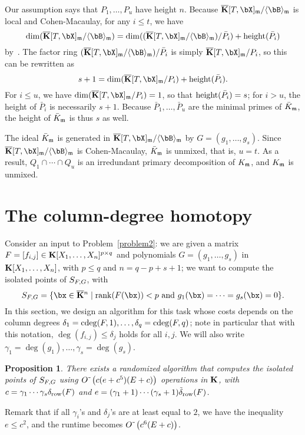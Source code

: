 \documentclass[12pt]{article}
\newtheorem{proposition}[definition]{Proposition}
\begin{document}
Our assumption says that $P_1,\dots,P_u$ have height $n$. Because
$\KKbar[T,\bX]_\m/\langle \bB \rangle_\m$ is local and Cohen-Macaulay, for any
$i \le t$, we have 
$$\dim(\KKbar[T,\bX]_\m/\langle \bB \rangle_\m)=\dim((\KKbar[T,\bX]_\m/\langle \bB \rangle_\m) / \bar P_i) + {\rm height}(\bar P_i)$$
by~\cite[Theorem~17.4(i)]{Matsumura86}.
The factor ring $(\KKbar[T,\bX]_\m/\langle \bB \rangle_\m) / \bar P_i$ is simply
$\KKbar[T,\bX]_\m/P_i$, so this can be rewritten as
$$s+1 = \dim(\KKbar[T,\bX]_\m/P_i) + {\rm height}(\bar P_i).$$ For $i\le
u$, we have $\dim(\KKbar[T,\bX]_\m/P_i)=1$, so that ${\rm height}(\bar
P_i)=s$; for $i > u$, the height of $\bar P_i$ is necessarily
$s+1$. Because $\bar P_1,\dots,\bar P_u$ are the minimal primes of
$\bar K_{\mathfrak{m}}$, the height of $\bar K_{\mathfrak{m}}$ is thus $s$ as well.

The ideal $\bar K_{\mathfrak{m}}$ is generated in $\KKbar[T,\bX]_\m/\langle \bB
\rangle_\m$ by $G=(g_1,\dots,g_s)$. Since $\KKbar[T,\bX]_\m/\langle
\bB \rangle_\m$ is Cohen-Macaulay, $\bar K_{\mathfrak{m}}$ is unmixed, that is,
$u=t$.  As a result, $Q_1 \cap \cdots \cap Q_u$ is an irredundant
primary decomposition of $K_{\mathfrak{m}}$, and $K_{\mathfrak{m}}$ is unmixed.


\section{The column-degree homotopy}\label{sec:columndegree}

Consider an input to Problem~\ref{problem2}: we are given a matrix
${F} =[f_{i,j}]\in \mathbf{K}[X_1,\dots,X_n]^{p \times q}$ and polynomials
$G=(g_1,\dots,g_s)$ in $\mathbf{K}[X_1,\dots,X_n]$, with $p \leq q$ and $n =
q-p+s+1$; we want to compute the isolated points of $S_{{F},G}$,
with
$$S_{\mF,G} = \{\bx \in \KKbar{}^n \mid  \mathrm{rank}(\mF({\bx})) < p
\text{~and~} g_1(\bx)=\cdots=g_s(\bx)=0\}.$$ In this section, we
design an algorithm for this task whose costs depends on the column
degrees $\delta_1=\mathrm{cdeg}({F},1),\dots,\delta_q=\mathrm{cdeg}({F},q)$; note in particular
that with this notation, $\deg(f_{i,j}) \leq \delta_j$ holds for all $i,j$.
We will also write $\gamma_1=\deg(g_1),\dots,\gamma_s=\deg(g_s)$.

\begin{proposition}
  There exists a randomized algorithm that computes the isolated
  points of $S_{{F},G}$ using ${O}{\,\tilde{ }\,}\left (c(e+c^5 )(E + c)\right)$
  operations in $\mathbf{K}$, with $c=\gamma_1\cdots\gamma_s \delta_{\rm
    row}({F})$ and $e=(\gamma_1+1)\cdots(\gamma_s+1) \tilde\delta_{\rm
    row}({F})$.
\end{proposition}
Remark that if all $\gamma_i$'s and $\delta_j$'s are at least equal to
$2$, we have the inequality $e \le c^2$, and the runtime becomes
${O}{\,\tilde{ }\,}\left (c^6 (E + c)\right)$.
\end{document}
